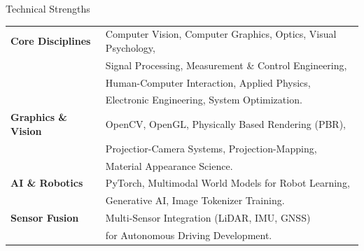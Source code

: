 \documentclass{resume} %
\begin{document}
\begin{rSection}{Technical Strengths}

  \begin{list}{}{
      \setlength{\leftmargin}{1.5em}
      \setlength{\topsep}{0pt}
    }
    \item \begin{tabular}{ @{} >{\bfseries}l @{\hspace{4ex}} l }
            Core Disciplines   & Computer Vision, Computer Graphics, Optics, Visual Psychology, \\
                               & Signal Processing, Measurement \& Control Engineering,         \\
                               & Human-Computer Interaction, Applied Physics,                   \\
                               & Electronic Engineering, System Optimization.                   \\
            \noalign{\smallskip}
            Graphics \& Vision & OpenCV, OpenGL, Physically Based Rendering (PBR),              \\
                               &
            Projectior-Camera Systems, Projection-Mapping,                                      \\
                               & Material Appearance Science.                                   \\
            \noalign{\smallskip}
            AI \& Robotics     & PyTorch, Multimodal World Models for Robot Learning,           \\
                               & Generative AI, Image Tokenizer Training.                       \\
            \noalign{\smallskip}
            Sensor Fusion      & Multi-Sensor Integration (LiDAR, IMU, GNSS)                    \\
                               & for Autonomous Driving Development.                            \\
          \end{tabular}
  \end{list}

\end{rSection}
\end{document}
